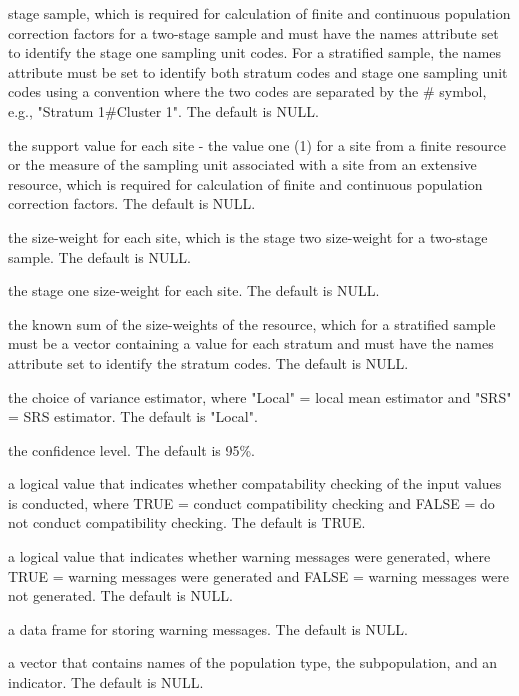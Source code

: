 \begin{Arguments}
\begin{ldescription}
stage sample, which is required for calculation of finite and  
continuous population correction factors for a two-stage sample and 
must have the names attribute set to identify the stage one sampling 
unit codes.  For a stratified sample, the names attribute must be set
to identify both stratum codes and stage one sampling unit codes using
a convention where the two codes are separated by the \# symbol, e.g.,
"Stratum 1\#Cluster 1".  The default is NULL.
\item[\code{support}] the support value for each site - the value one (1) for a 
site from a finite resource or the measure of the sampling unit  
associated with a site from an extensive resource, which is required  
for calculation of finite and continuous population correction  
factors.  The default is NULL.
\item[\code{swgt}] the size-weight for each site, which is the stage two size-weight 
for a two-stage sample.  The default is NULL.
\item[\code{swgt1}] the stage one size-weight for each site.  The default is NULL.
\item[\code{unitsize}] the known sum of the size-weights of the resource, which for a 
stratified sample must be a vector containing a value for each stratum 
and must have the names attribute set to identify the stratum codes.  
The default is NULL.
\item[\code{vartype}] the choice of variance estimator, where "Local" = local mean
estimator and "SRS" = SRS estimator.  The default is "Local".
\item[\code{conf}] the confidence level.  The default is 95\%.
\item[\code{check.ind}] a logical value that indicates whether compatability
checking of the input values is conducted, where TRUE = conduct 
compatibility checking and FALSE = do not conduct compatibility 
checking.  The default is TRUE.
\item[\code{warn.ind}] a logical value that indicates whether warning messages were
generated, where TRUE = warning messages were generated and FALSE = warning
messages were not generated.  The default is NULL.
\item[\code{warn.df}] a data frame for storing warning messages.  The default is
NULL.
\item[\code{warn.vec}] a vector that contains names of the population type, the
subpopulation, and an indicator.  The default is NULL.
\end{ldescription}
\end{Arguments}
